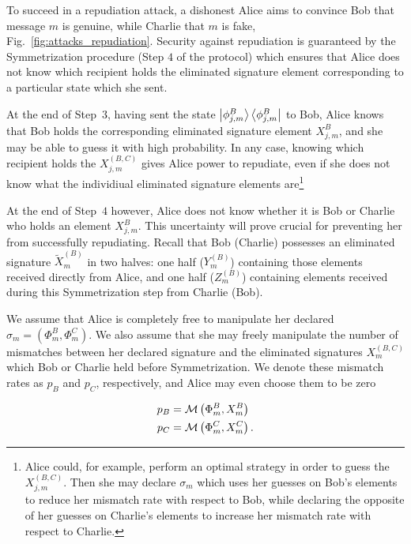 To succeed in a repudiation attack, a dishonest Alice aims to convince Bob that message $m$ is genuine, while Charlie that $m$ is fake, Fig.~\ref{fig:attacks_repudiation}. Security against repudiation is guaranteed by the Symmetrization procedure (Step $4$ of the protocol) which ensures that Alice does not know which recipient holds the eliminated signature element corresponding to a particular state which she sent. 

At the end of Step~$3$, having sent the state $\ket{\phi_{j, m}^B}\bra{\phi_{j, m}^B}$ to Bob, Alice knows that Bob holds the corresponding eliminated signature element $X_{j, m}^B$, and she may be able to guess it with high probability. In any case, knowing which recipient holds the $X_{j, m}^{\left(B, C\right)}$ gives Alice power to repudiate, even if she does not know what the individiual eliminated signature elements are\footnote{Alice could, for example, perform an optimal strategy in order to guess the $X_{j, m}^{\left(B, C\right)}$. Then she may declare $\sigma_m$ which uses her guesses on Bob's elements to reduce her mismatch rate with respect to Bob, while declaring the opposite of her guesses on Charlie's elements to increase her mismatch rate with respect to Charlie.}

At the end of Step~$4$ however, Alice does not know whether it is Bob or Charlie who holds an element $X_{j, m}^B$. This uncertainty will prove crucial for preventing her from successfully repudiating. Recall that Bob  (Charlie) possesses an eliminated signature $\tilde{X}_m^{\left(B\right)}$ in two halves: one half ($Y_m^{\left(B\right)}$) containing those elements received directly from Alice, and one half ($Z_m^{\left(B\right)}$) containing elements received during this Symmetrization step from Charlie (Bob).

We assume that Alice is completely free to manipulate her declared $\sigma_m = \left(\Phi_m^B, \Phi_m^C\right)$. We also assume that she may freely manipulate the number of mismatches %
between her declared signature and the eliminated signatures $X_m^{\left(B, C\right)}$ which Bob or Charlie held before Symmetrization. We denote these mismatch rates as $p_B$ and $p_C$, respectively, and Alice may even choose them to be zero

\begin{align}
p_B &= \mathcal{M}\left(\Phi_m^B, X_m^B\right) \notag \\
p_C &= \mathcal{M}\left(\Phi_m^C, X_m^C\right).
\end{align}

